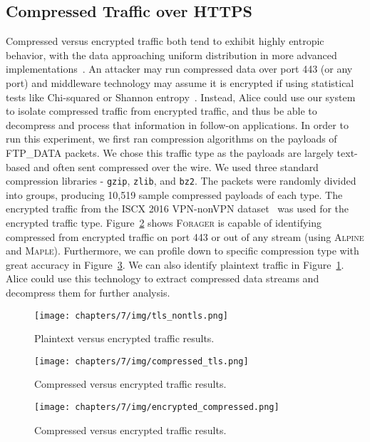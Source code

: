 \subsection{Compressed Traffic over HTTPS}
Compressed versus encrypted traffic both tend to exhibit highly entropic behavior, with the data approaching uniform distribution in more advanced implementations~\cite{hedge}. An attacker may run compressed data over port 443 (or any port) and middleware technology may assume it is encrypted if using statistical tests like Chi-squared or Shannon entropy~\cite{gaspari2020encod}. Instead, Alice could use our system to isolate compressed traffic from encrypted traffic, and thus be able to decompress and process that information in follow-on applications. In order to run this experiment, we first ran compression algorithms on the payloads of FTP\_DATA packets. We chose this traffic type as the payloads are largely text-based and often sent compressed over the wire. We used three standard compression libraries - \texttt{gzip}, \texttt{zlib}, and \texttt{bz2}. The packets were randomly divided into groups, producing 10,519 sample compressed payloads of each type. The encrypted traffic from the ISCX 2016 VPN-nonVPN dataset~\cite{iscx-vpn-paper} was used for the encrypted traffic type. Figure~\ref{fig:tlscomp} shows \textsc{Forager} is capable of identifying compressed from encrypted traffic on port 443 or out of any stream (using \textsc{Alpine} and \textsc{Maple}). Furthermore, we can profile down to specific compression type with great accuracy in Figure~\ref{fig:comptype}. We can also identify plaintext traffic in Figure~\ref{fig:tlsnontls}. Alice could use this technology to extract compressed data streams and decompress them for further analysis.

\begin{figure} [ht!]
\centering
\texttt{[image: chapters/7/img/tls\_nontls.png]}
\caption{Plaintext versus encrypted traffic results.}
\label{fig:tlsnontls}
\end{figure}

\begin{figure} [ht!]
\centering
\texttt{[image: chapters/7/img/compressed\_tls.png]}
\caption{Compressed versus encrypted traffic results.}
\label{fig:tlscomp}
\end{figure}

\begin{figure} [ht!]
\centering
\texttt{[image: chapters/7/img/encrypted\_compressed.png]}
\caption{Compressed versus encrypted traffic results.}
\label{fig:comptype}
\end{figure}


